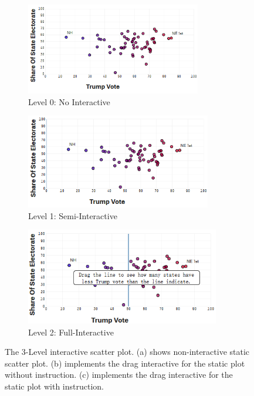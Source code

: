 \documentclass[9pt,journal,compsoc]{IEEEtran}
\begin{document}
\begin{figure} 
  \centering
  \begin{subfigure}{.33\textwidth}
  \centering
  \includegraphics[width=0.84\textwidth]{ScatterLv1.png}
  \caption{Level 0: No Interactive}
  \label{}
  \end{subfigure}%
  \begin{subfigure}{.33\textwidth}
  \centering
  \includegraphics[width=0.89\textwidth]{ScatterLv2.png}
  \caption{Level 1: Semi-Interactive}
  \label{}
  \end{subfigure}%
  \begin{subfigure}{.33\textwidth}
  \centering
  \includegraphics[width=0.93\textwidth]{ScatterLv3.png}
  \caption{Level 2: Full-Interactive}
  \label{}
  \end{subfigure}
  \parbox{17cm}{\caption{The 3-Level interactive scatter plot. (a) shows non-interactive static scatter plot. (b) implements the drag interactive for the static plot without instruction. (c) implements the drag interactive for the static plot with instruction.}}
\label{fig:1}
\end{figure}
\end{document}
